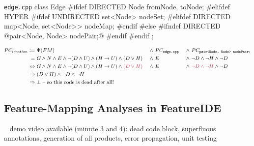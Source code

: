 \begin{frame}[fragile]{\myframetitle}
\begin{mycolumns}[t,columns=4,widths={31,20,20,29},animation=none]
\begin{cpptight}[basicstyle=\tiny]{\texttt{edge.cpp}}
class Edge {
#ifdef DIRECTED
	Node fromNode, toNode;
#elifdef HYPER
#ifdef UNDIRECTED
	set<Node> nodeSet;
#elifdef DIRECTED
	map<Node, set<Node>> nodeMap;
#endif
#else
#ifndef DIRECTED
	@pair<Node, Node> nodePair;@
#endif
#endif
};
		\end{cpptight}
	\end{mycolumns}
	\begin{alignat*}{3}
		PC_{location} \defeq~&\Phi(FM) &~\pand~& PC_{\texttt{edge.cpp}} &~\pand~& PC_{\texttt{pair<Node, Node> nodePair;}}\\
		=~&G \pand N \pand E \pand \pnot (D \pand U) \pand (H \pimplies U) \pand (D \por H) &~\pand~& E &~\pand~& \pnot D \pand \pnot H \pand \pnot D\\
		\mequals~&G \pand N \pand E \pand \pnot (D \pand U) \pand (H \pimplies U) \pand {\color{red}(D \por H)} &~\pand~& E &~\pand~& {\color{red}\pnot D \pand \pnot H} \pand \pnot D\\
		\mimplies~&(D \por H) \pand \pnot D \pand \pnot H\\
		\mimplies~&\bot \text{ -- so this code is dead after all!}
	\end{alignat*}
\end{frame}

\subsection{Feature-Mapping Analyses in FeatureIDE}

\begin{frame}{\myframetitle}
	\begin{mycolumns}[widths={57,43}]
		~
		\href{https://youtu.be/jVe7f32mLCQ?t=125}{demo video available} (minute 3 and 4): dead code block, superfluous annotations, generation of all products, error propagation, unit testing
	\mynextcolumn
	\end{mycolumns}
\end{frame}
